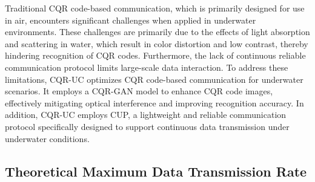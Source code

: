 \documentclass[preprint,12pt]{elsarticle}
\begin{document}
Traditional CQR code-based communication, which is primarily designed for use in air, encounters significant challenges when applied in underwater environments. These challenges are primarily due to the effects of light absorption and scattering in water, which result in color distortion and low contrast, thereby hindering recognition of CQR codes. 
Furthermore, the lack of continuous reliable communication protocol limits large-scale data interaction. To address these limitations, CQR-UC optimizes CQR code-based communication for underwater scenarios. It employs a CQR-GAN model to enhance CQR code images, effectively mitigating optical interference and improving recognition accuracy. In addition, CQR-UC employs CUP, a lightweight and reliable communication protocol specifically designed to support continuous data transmission under underwater conditions.

\subsection{Theoretical Maximum Data Transmission Rate}
\end{document}
